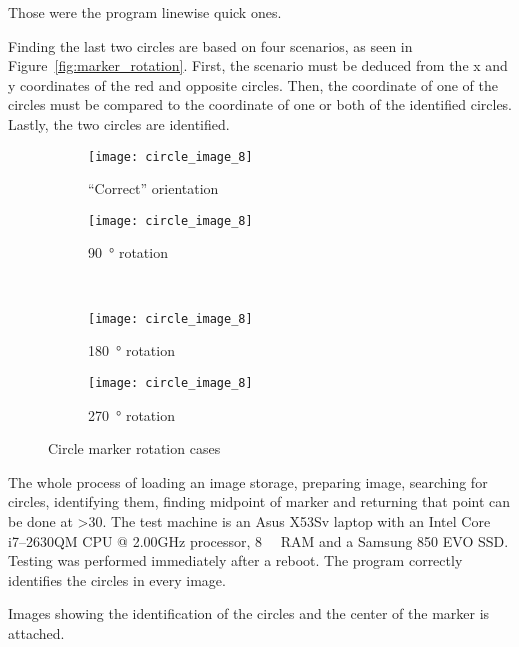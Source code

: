 Those were the program linewise quick ones.

Finding the last two circles are based on four scenarios, as seen in Figure~\vref{fig:marker_rotation}.
First, the scenario must be deduced from the x and y coordinates of the red and opposite circles.
Then, the coordinate of one of the circles must be compared to the coordinate of one or both of the identified circles.
Lastly, the two circles are identified.

\begin{figure}[ht]
\centering
\begin{subfigure}[b]{0.45\linewidth}
\centering
    \texttt{[image: circle\_image\_8]}
    \caption{``Correct'' orientation}
\label{fig:marker_rotation_1}
\end{subfigure}
\begin{subfigure}[b]{0.45\linewidth}
\centering
    \texttt{[image: circle\_image\_8]}
    \caption{\SI{90}{\degree} rotation}
\label{fig:marker_rotation_2}
\end{subfigure}\\
\begin{subfigure}[b]{0.45\linewidth}
\centering
    \texttt{[image: circle\_image\_8]}
    \caption{\SI{180}{\degree} rotation}
\label{fig:marker_rotation_3}
\end{subfigure}
\begin{subfigure}[b]{0.45\linewidth}
\centering
    \texttt{[image: circle\_image\_8]}
    \caption{\SI{270}{\degree} rotation}
\label{fig:marker_rotation_4}
\end{subfigure}
\caption{Circle marker rotation cases}
\label{fig:marker_rotation}
\end{figure}

The whole process of loading an image storage, preparing image, searching for circles, identifying them,
finding midpoint of marker and returning that point can be done at \SI{>30}{\fps}.
The test machine is an Asus X53Sv laptop with an Intel Core i7--2630QM CPU @ 2.00GHz processor, \SI{8}{\giga\byte} RAM and a Samsung 850 EVO SSD.\@
Testing was performed immediately after a reboot.
The program correctly identifies the circles in every image.

Images showing the identification of the circles and the center of the marker is attached. 
